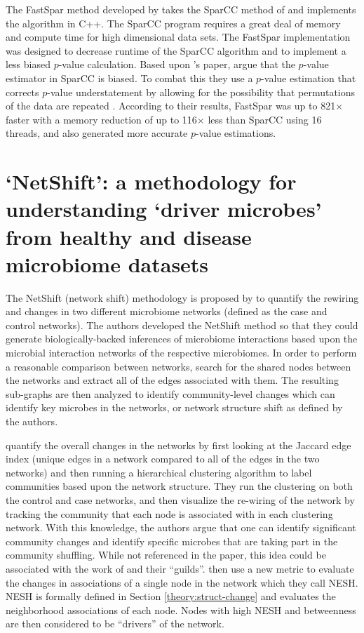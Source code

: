 The \acrshort{FastSpar} method developed by \citet{Watts2018} takes the \acrshort{SparCC} method of \citeauthor{Friedman2012} and implements the algorithm in C++. The \acrshort{SparCC} program requires a great deal of memory and compute time for high dimensional data sets. The \acrshort{FastSpar} implementation was designed to decrease runtime of the \acrshort{SparCC} algorithm and to implement a less biased $p$-value calculation. Based upon \citeauthor{Phipson2010}'s paper, \citeauthor{Watts2018} argue that the $p$-value estimator in \acrshort{SparCC} is biased. To combat this they use a $p$-value estimation that corrects $p$-value understatement by allowing for the possibility that permutations of the data are repeated \citep{Watts2018, Phipson2010}. According to their results, \acrshort{FastSpar} was up to 821$\times$ faster with a memory reduction of up to 116$\times$ less than \acrshort{SparCC} using 16 threads, and also generated more accurate $p$-value estimations.

\section{‘NetShift’: a methodology for understanding ‘driver microbes’ from healthy and disease microbiome datasets}\label{lit-netshift}
The NetShift (network shift) methodology is proposed by \citet{Kuntal2018} to quantify the rewiring and changes in two different microbiome networks (defined as the case and control networks). The authors developed the \acrshort{NetShift} method so that they could generate biologically-backed inferences of microbiome interactions based upon the microbial interaction networks of the respective microbiomes. In order to perform a reasonable comparison between networks, \citeauthor{Kuntal2018} search for the shared nodes between the networks and extract all of the edges associated with them. The resulting sub-graphs are then analyzed to identify community-level changes which can identify key microbes in the networks, or network structure shift as defined by the authors. 

\citeauthor{Kuntal2018} quantify the overall changes in the networks by first looking at the Jaccard edge index (unique edges in a network compared to all of the edges in the two networks) and then running a hierarchical clustering algorithm to label communities based upon the network structure. They run the clustering on both the control and case networks, and then visualize the re-wiring of the network by tracking the community that each node is associated with in each clustering network. With this knowledge, the authors argue that one can identify significant community changes and identify specific microbes that are taking part in the community shuffling. While not referenced in the paper, this idea could be associated with the work of \citet{Goldford2018} and their ``guilds''. \citeauthor{Kuntal2018} then use a new metric to evaluate the changes in associations of a single node in the network which they call \acrfull{NESH}. \acrshort{NESH} is formally defined in Section \ref{theory:struct-change} and evaluates the neighborhood associations of each node. Nodes with high \acrshort{NESH} and betweenness are then considered to be ``drivers'' of the network. 

